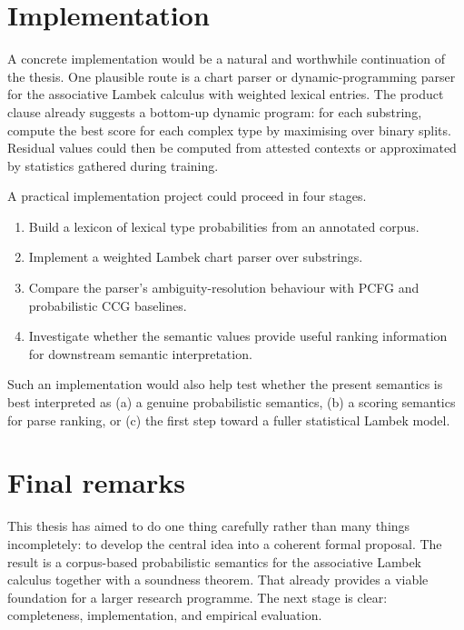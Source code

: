 \section{Implementation}
A concrete implementation would be a natural and worthwhile continuation of the thesis.
One plausible route is a chart parser or dynamic-programming parser for the associative Lambek
calculus with weighted lexical entries. The product clause already suggests a bottom-up dynamic
program: for each substring, compute the best score for each complex type by maximising over
binary splits. Residual values could then be computed from attested contexts or approximated by
statistics gathered during training.

A practical implementation project could proceed in four stages.
\begin{enumerate}[label=(\arabic*)]
    \item Build a lexicon of lexical type probabilities from an annotated corpus.
    \item Implement a weighted Lambek chart parser over substrings.
    \item Compare the parser's ambiguity-resolution behaviour with PCFG and probabilistic CCG
    baselines.
    \item Investigate whether the semantic values provide useful ranking information for downstream
    semantic interpretation.
\end{enumerate}

Such an implementation would also help test whether the present semantics is best interpreted as
(a) a genuine probabilistic semantics, (b) a scoring semantics for parse ranking, or (c) the first
step toward a fuller statistical Lambek model.


\section{Final remarks}
This thesis has aimed to do one thing carefully rather than many things incompletely: to develop
the central idea into a coherent formal proposal. The result is a
corpus-based probabilistic semantics for the associative Lambek calculus together with a
soundness theorem. That already provides a viable foundation for a larger research programme.
The next stage is clear: completeness, implementation, and empirical evaluation.
